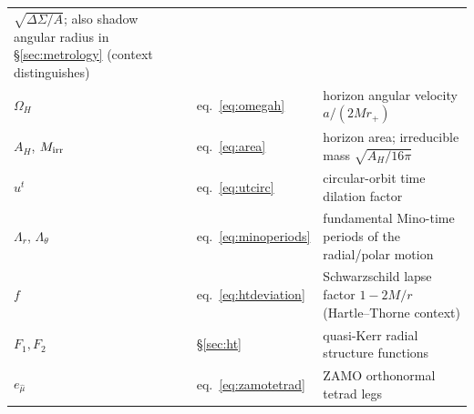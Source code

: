 \begin{longtable}{llp{}}
$\sqrt{\Delta\Sigma/A}$; also shadow angular radius in
\S\ref{sec:metrology} (context distinguishes) \\
$\Omega_H$ & eq.~\eqref{eq:omegah} & horizon angular velocity
$a/(2Mr_+)$ \\
$A_H$, $M_{\rm irr}$ & eq.~\eqref{eq:area} & horizon area; irreducible
mass $\sqrt{A_H/16\pi}$ \\
$u^t$ & eq.~\eqref{eq:utcirc} & circular-orbit time dilation factor \\
$\Lambda_r$, $\Lambda_\theta$ & eq.~\eqref{eq:minoperiods} &
fundamental Mino-time periods of the radial/polar motion \\
$f$ & eq.~\eqref{eq:htdeviation} & Schwarzschild lapse factor
$1 - 2M/r$ (Hartle--Thorne context) \\
$F_1, F_2$ & \S\ref{sec:ht} & quasi-Kerr radial structure functions \\
$e_{\hat\mu}$ & eq.~\eqref{eq:zamotetrad} & ZAMO orthonormal tetrad
legs \\
\end{longtable}
\endgroup
